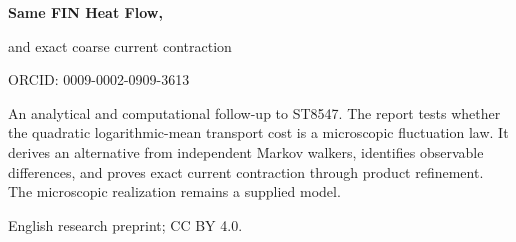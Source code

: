 \documentclass[11pt,a4paper]{article}
\begin{document}
\hypersetup{pageanchor=false}
\begin{titlepage}\centering\vspace*{16mm}
{\Huge\bfseries Same FIN Heat Flow,\par}
\vspace{3mm}{\Huge\bfseries Different Fluctuation Actions\par}
\vspace{8mm}{\LARGE Cosh dissipation, integer-count constraints,\par}
{\LARGE and exact coarse current contraction\par}
\vspace{12mm}{\Large Programme ST8548\par}
\vspace{8mm}{\Large Krzysztof \.Zuchowski\par}
\vspace{3mm}{Independent Researcher --- Fractal Information Theory Project\par}
{ORCID: 0009-0002-0909-3613\par}
\vspace{9mm}{6 September 2026\par}
\vfill
\begin{minipage}{.87\textwidth}
An analytical and computational follow-up to ST8547. The report tests whether
the quadratic logarithmic-mean transport cost is a microscopic fluctuation
law. It derives an alternative from independent Markov walkers, identifies
observable differences, and proves exact current contraction through product
refinement. The microscopic realization remains a supplied model.
\end{minipage}
\vfill{\small English research preprint; CC BY 4.0.}
\end{titlepage}\hypersetup{pageanchor=true}
\end{document}
